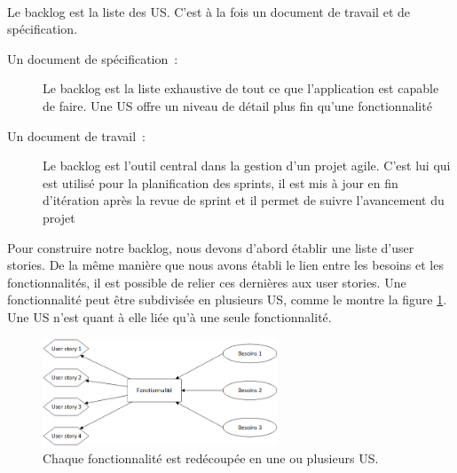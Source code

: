 			\paragraph{}%
			Le backlog est la liste des US. C'est à la fois un document de
			travail et de spécification.
			\begin{description}
				\item[Un document de spécification~:] Le backlog est la liste exhaustive de
				tout ce que l'application est capable de faire. Une US offre un
				niveau de détail plus fin qu'une fonctionnalité
				\item[Un document de travail~:] Le backlog est l'outil central dans la
				gestion d'un projet agile. C'est lui qui est utilisé pour la planification
				des sprints, il est mis à jour en fin d'itération après la revue de sprint
				et il permet de suivre l'avancement du projet
			\end{description}
			Pour construire notre backlog, nous devons d'abord établir une liste d'user
			stories.
			De la même manière que nous avons établi le lien entre les besoins et
			les fonctionnalités, il est possible de relier ces dernières aux user
			stories.
			Une fonctionnalité peut être subdivisée en plusieurs US, comme le
			montre la figure \ref{mapping_fonctios_us}. Une US n'est quant à elle
			liée qu'à une seule fonctionnalité.
			\begin{figure}[H]%
				\centering
				\includegraphics[width=7cm]{../img/part3/mapping_fonctios_us.png}
				\caption{\label{mapping_fonctios_us} Chaque fonctionnalité est redécoupée
				en une ou plusieurs US.}
			\end{figure}
			
